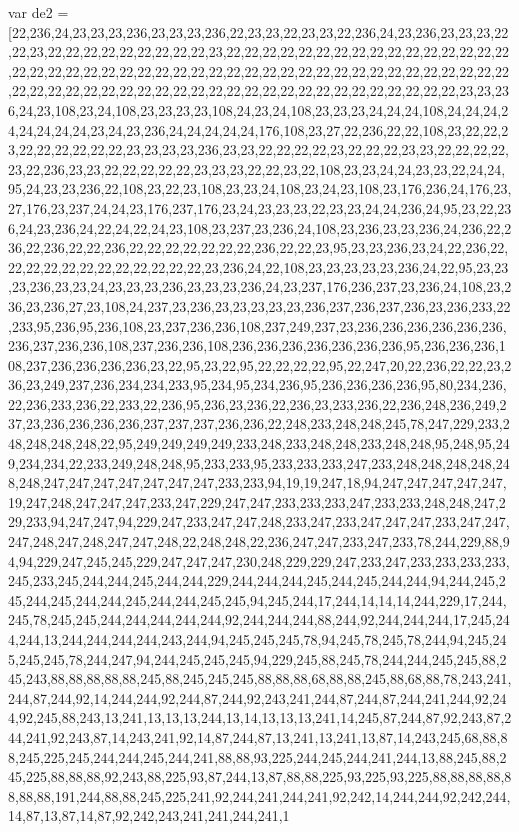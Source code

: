 var de2 = [22,236,24,23,23,23,236,23,23,23,236,22,23,23,22,23,23,22,236,24,23,236,23,23,23,22,22,23,22,22,22,22,22,22,22,22,22,23,22,22,22,22,22,22,22,22,22,22,22,22,22,22,22,22,22,22,22,22,22,22,22,22,22,22,22,22,22,22,22,22,22,22,22,22,22,22,22,22,22,22,22,22,22,22,22,22,22,22,22,22,22,22,22,22,22,22,22,22,22,22,22,22,22,22,22,22,22,23,23,236,24,23,108,23,24,108,23,23,23,23,108,24,23,24,108,23,23,23,24,24,24,108,24,24,24,24,24,24,24,24,23,24,23,236,24,24,24,24,24,176,108,23,27,22,236,22,22,108,23,22,22,23,22,22,22,22,22,22,23,23,23,23,236,23,23,22,22,22,22,23,22,22,22,23,23,22,22,22,22,23,22,236,23,23,22,22,22,22,22,23,23,23,22,22,23,22,108,23,23,24,24,23,23,22,24,24,95,24,23,23,236,22,108,23,22,23,108,23,23,24,108,23,24,23,108,23,176,236,24,176,23,27,176,23,237,24,24,23,176,237,176,23,24,23,23,23,22,23,23,24,24,236,24,95,23,22,236,24,23,236,24,22,24,22,24,23,108,23,237,23,236,24,108,23,236,23,23,236,24,236,22,236,22,236,22,22,236,22,22,22,22,22,22,22,236,22,22,23,95,23,23,236,23,24,22,236,22,22,22,22,22,22,22,22,22,22,22,22,23,236,24,22,108,23,23,23,23,23,236,24,22,95,23,23,23,236,23,23,24,23,23,23,236,23,23,23,236,24,23,237,176,236,237,23,236,24,108,23,236,23,236,27,23,108,24,237,23,236,23,23,23,23,23,236,237,236,237,236,23,236,233,22,233,95,236,95,236,108,23,237,236,236,108,237,249,237,23,236,236,236,236,236,236,236,237,236,236,108,237,236,236,108,236,236,236,236,236,236,236,95,236,236,236,108,237,236,236,236,236,23,22,95,23,22,95,22,22,22,22,95,22,247,20,22,236,22,22,23,236,23,249,237,236,234,234,233,95,234,95,234,236,95,236,236,236,236,95,80,234,236,22,236,233,236,22,233,22,236,95,236,23,236,22,236,23,233,236,22,236,248,236,249,237,23,236,236,236,236,237,237,237,236,236,22,248,233,248,248,245,78,247,229,233,248,248,248,248,22,95,249,249,249,249,233,248,233,248,248,233,248,248,95,248,95,249,234,234,22,233,249,248,248,95,233,233,95,233,233,233,247,233,248,248,248,248,248,248,247,247,247,247,247,247,247,233,233,94,19,19,247,18,94,247,247,247,247,247,19,247,248,247,247,247,233,247,229,247,247,233,233,233,247,233,233,248,248,247,229,233,94,247,247,94,229,247,233,247,247,248,233,247,233,247,247,247,233,247,247,247,248,247,248,247,247,248,22,248,248,22,236,247,247,233,247,233,78,244,229,88,94,94,229,247,245,245,229,247,247,247,230,248,229,229,247,233,247,233,233,233,233,245,233,245,244,244,245,244,244,229,244,244,244,245,244,245,244,244,94,244,245,245,244,245,244,244,245,244,244,245,245,94,245,244,17,244,14,14,14,244,229,17,244,245,78,245,245,244,244,244,244,244,92,244,244,244,88,244,92,244,244,244,17,245,244,244,13,244,244,244,244,243,244,94,245,245,245,78,94,245,78,245,78,244,94,245,245,245,245,78,244,247,94,244,245,245,245,94,229,245,88,245,78,244,244,245,245,88,245,243,88,88,88,88,88,245,88,245,245,245,88,88,88,68,88,88,245,88,68,88,78,243,241,244,87,244,92,14,244,244,92,244,87,244,92,243,241,244,87,244,87,244,241,244,92,244,92,245,88,243,13,241,13,13,13,244,13,14,13,13,13,241,14,245,87,244,87,92,243,87,244,241,92,243,87,14,243,241,92,14,87,244,87,13,241,13,241,13,87,14,243,245,68,88,88,245,225,245,244,244,245,244,241,88,88,93,225,244,245,244,241,244,13,88,245,88,245,225,88,88,88,92,243,88,225,93,87,244,13,87,88,88,225,93,225,93,225,88,88,88,88,88,88,88,191,244,88,88,245,225,241,92,244,241,244,241,92,242,14,244,244,92,242,244,14,87,13,87,14,87,92,242,243,241,241,244,241,1